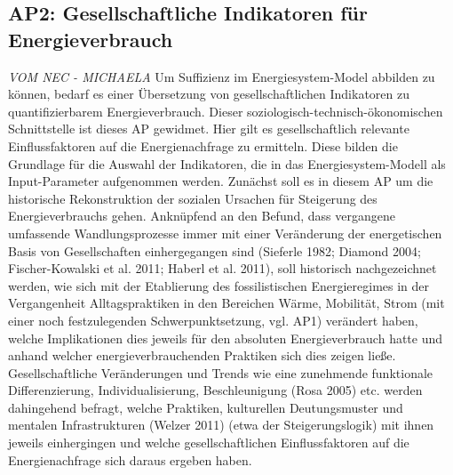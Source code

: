 \documentclass[a4paper,11pt,twoside]{scrartcl}
\begin{document}
\subsection*{AP2: Gesellschaftliche Indikatoren für Energieverbrauch}
\textit{VOM NEC - MICHAELA}
Um Suffizienz im Energiesystem-Model abbilden zu können, bedarf es einer Übersetzung von gesellschaftlichen Indikatoren zu quantifizierbarem Energieverbrauch. Dieser soziologisch-technisch-ökonomischen Schnittstelle ist dieses AP gewidmet. Hier gilt es gesellschaftlich relevante Einflussfaktoren auf die Energienachfrage zu ermitteln. Diese bilden die Grundlage für die Auswahl der Indikatoren, die in das Energiesystem-Modell als Input-Parameter aufgenommen werden. Zunächst soll es in diesem AP um die historische Rekonstruktion der sozialen Ursachen für Steigerung des Energieverbrauchs gehen. Anknüpfend an den Befund, dass vergangene umfassende Wandlungsprozesse immer mit einer Veränderung der energetischen Basis von Gesellschaften einhergegangen sind (Sieferle 1982; Diamond 2004; Fischer-Kowalski et al. 2011; Haberl et al. 2011), soll historisch nachgezeichnet werden, wie sich mit der Etablierung des fossilistischen Energieregimes in der Vergangenheit Alltagspraktiken in den Bereichen Wärme, Mobilität, Strom (mit einer noch festzulegenden Schwerpunktsetzung, vgl. AP1) verändert haben, welche Implikationen dies jeweils für den absoluten Energieverbrauch hatte und anhand welcher energieverbrauchenden Praktiken sich dies zeigen ließe. Gesellschaftliche Veränderungen und Trends wie eine zunehmende funktionale Differenzierung, Individualisierung, Beschleunigung (Rosa 2005) etc. werden dahingehend befragt, welche Praktiken, kulturellen Deutungsmuster und mentalen Infrastrukturen (Welzer 2011) (etwa der Steigerungslogik) mit ihnen jeweils einhergingen und welche gesellschaftlichen Einflussfaktoren auf die Energienachfrage sich daraus ergeben haben.

\end{document}
